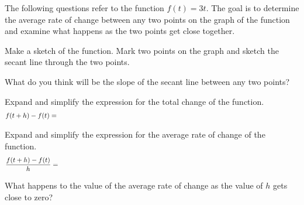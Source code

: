 \begin{problem}
\item The following questions refer to the function $f(t)=3t$.  The
  goal is to determine the average rate of change between any two
  points on the graph of the function and examine what happens as the
  two points get close together.
    \begin{subproblem}
      \item  Make a sketch of the function. Mark two points on the
        graph and sketch the secant line through the two points.
        \vfill
      \item What do you think will be the slope of the secant line
        between any two points?
        \vspace{1em}
      \item Expand and simplify the expression for the total change
        of the function.
        \begin{eqnarray*}
          f(t+h)-f(t) & = & \hskip \textwidth
        \end{eqnarray*}
        \vfill
      \item Expand and simplify the expression for the average rate
        of change of the function.
      \begin{eqnarray*}
        \frac{f(t+h)-f(t)}{h} & = & \hskip \textwidth
      \end{eqnarray*}
      \vfill
    \item What happens to the value of the average rate of change as
      the value of $h$ gets close to zero?
      \vspace{3em}
    \end{subproblem}

  \clearpage


\end{problem}
